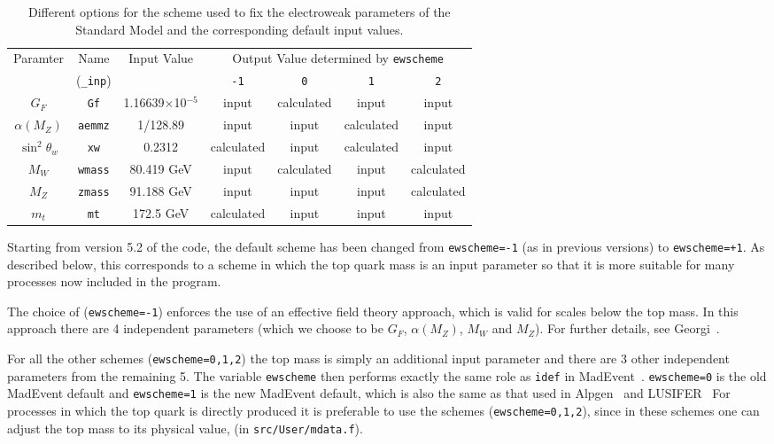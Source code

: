 \documentclass[12pt]{article}
\begin{document}
\begin{table}
\begin{center}
\begin{tabular}{|c|c|c|c|c|c|c|} \hline
 Paramter & Name & Input Value
 & \multicolumn{4}{c|}{Output Value determined by \tt ewscheme} \\
\cline{4-7}
& ({\tt \_inp}) & & {\tt -1} & {\tt 0} & {\tt 1} & {\tt 2} \\ \hline
$G_F$            & {\tt Gf}      & 1.16639$\times$10$^{-5}$ 
 & input & calculated & input & input \\
$\alpha(M_Z)$    & {\tt aemmz}   & 1/128.89                 
 & input & input & calculated & input \\
$\sin^2 \theta_w$& {\tt xw}      & 0.2312               
 & calculated & input & calculated & input \\
$M_W$            & {\tt wmass}   & 80.419 GeV                
 & input & calculated & input & calculated \\
$M_Z$            & {\tt zmass}   & 91.188 GeV               
 & input & input & input & calculated \\
$m_t$            & {\tt mt}      & 172.5 GeV                  
 & calculated & input & input & input \\
\hline
\end{tabular}
\caption{Different options for the scheme used to fix the electroweak
parameters of the Standard Model and the corresponding default input
values.}
\label{ewscheme}
\end{center}
\end{table}

Starting from version 5.2 of the code, the default scheme has been
changed from {\tt ewscheme=-1} (as in previous versions) to
{\tt ewscheme=+1}. As described below, this corresponds to a scheme
in which the top quark mass is an input parameter so that it is
more suitable for many processes now included in the program.

The choice of ({\tt ewscheme=-1}) enforces the use of an effective field
theory approach, which is valid for scales below the top mass. In this
approach there are 4 independent parameters (which we choose to be
$G_F$, $\alpha(M_Z)$, $M_W$ and $M_Z$). For further details,
see Georgi~\cite{Georgi:1991ci}.

For all the other schemes ({\tt ewscheme=0,1,2}) the top mass is simply
an additional input parameter and there are 3 other independent
parameters from the remaining 5. The variable {\tt ewscheme} then performs
exactly the same role as {\tt idef} in MadEvent~\cite{Maltoni:2002qb}.
{\tt ewscheme=0} is the old MadEvent default and {\tt ewscheme=1} is the
new MadEvent default, which is also the same as that used in 
Alpgen~\cite{Alpgen} and LUSIFER~\cite{Lusifer} 
For processes in which the top quark is directly produced  it is 
preferable to use  the schemes ({\tt ewscheme=0,1,2}), since in these schemes
one can adjust the top mass to its physical value, (in {\tt src/User/mdata.f}).
\end{document}
